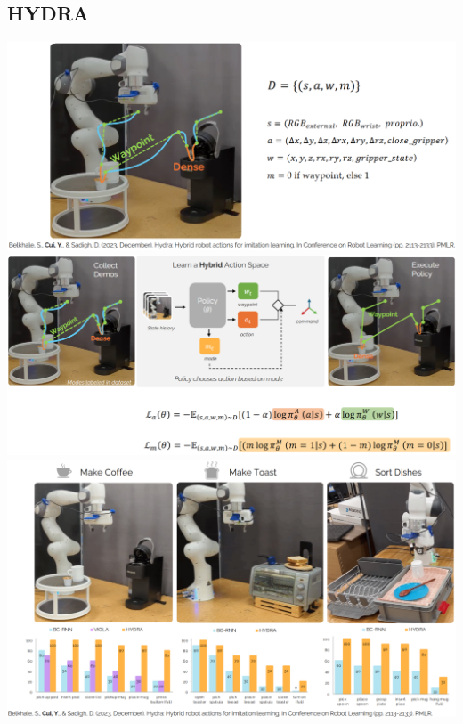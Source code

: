 \documentclass[10pt]{article}
\begin{document}
\subsection*{HYDRA}
\begin{center}
    \includegraphics*[width=\textwidth]{L2_13.png} \\
    \includegraphics*[width=\textwidth]{L2_14.png} \\
    \includegraphics*[width=\textwidth]{L2_15.png}
\end{center}
\end{document}
